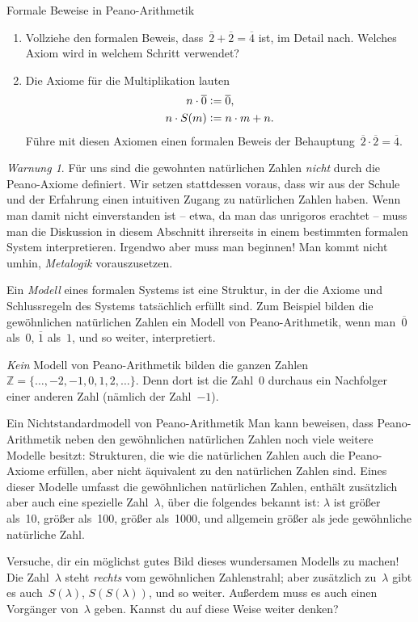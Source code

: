 \documentclass[twoside]{../zirkelblatt1415}
\newcommand{\ZZ}{\mathbb{Z}}
\theoremstyle{definition}
\theoremstyle{plain}
\theoremstyle{remark}
\newtheorem{warnung}[defn]{Warnung}
\newcommand{\defeq}{\vcentcolon=}
\newcommand{\ol}[1]{\overline{#1}}
\begin{document}
\begin{aufgabe}{Formale Beweise in Peano-Arithmetik}
\begin{enumerate}
\item Vollziehe den formalen Beweis, dass~$\ol{2} + \ol{2} = \ol{4}$ ist, im Detail nach. Welches
Axiom wird in welchem Schritt verwendet?
\item Die Axiome für die Multiplikation lauten
\begin{align*}
  n \cdot \ol{0} &\defeq \ol{0}, \\
  n \cdot S(m) &\defeq n \cdot m + n.
\end{align*}
Führe mit diesen Axiomen einen formalen Beweis der Behauptung~$\ol{2} \cdot \ol{2} = \ol{4}$.
\end{enumerate}\fixlistspacing
\end{aufgabe}

\begin{warnung}Für uns sind die gewohnten natürlichen Zahlen \emph{nicht} durch
die Peano-Axiome definiert. Wir setzen stattdessen voraus, dass wir aus der
Schule und der Erfahrung einen intuitiven Zugang zu natürlichen Zahlen haben.
Wenn man damit nicht einverstanden ist -- etwa, da man das unrigoros erachtet --
muss man die Diskussion in diesem Abschnitt ihrerseits in einem bestimmten formalen
System interpretieren. Irgendwo aber muss man beginnen! Man kommt nicht umhin,
\emph{Metalogik} vorauszusetzen.
\end{warnung}

Ein \emph{Modell} eines formalen Systems ist eine Struktur, in der die Axiome
und Schlussregeln des Systems tatsächlich erfüllt sind. Zum Beispiel bilden die
gewöhnlichen natürlichen Zahlen ein Modell von Peano-Arithmetik, wenn
man~$\ol{0}$ als~$0$, $\ol{1}$ als~$1$, und so weiter, interpretiert.

\emph{Kein} Modell von Peano-Arithmetik bilden die ganzen Zahlen~$\ZZ = \{
\ldots,-2,-1,0,1,2,\ldots \}$. Denn dort ist die Zahl~$0$ durchaus ein
Nachfolger einer anderen Zahl (nämlich der Zahl~$-1$).

\begin{aufgabe}{Ein Nichtstandardmodell von Peano-Arithmetik}
Man kann beweisen, dass Peano-Arithmetik neben den gewöhnlichen natürlichen
Zahlen noch viele weitere Modelle besitzt: Strukturen, die wie die natürlichen
Zahlen auch die Peano-Axiome erfüllen, aber nicht äquivalent zu den natürlichen
Zahlen sind. Eines dieser Modelle umfasst die gewöhnlichen natürlichen Zahlen,
enthält zusätzlich aber auch eine spezielle Zahl~$\lambda$, über die
folgendes bekannt ist: $\lambda$ ist größer als~10, größer als~100, größer
als~1000, und allgemein größer als jede gewöhnliche natürliche Zahl.

Versuche, dir ein möglichst gutes Bild dieses wundersamen Modells zu machen!
Die Zahl~$\lambda$ steht \emph{rechts} vom gewöhnlichen Zahlenstrahl; aber
zusätzlich zu~$\lambda$ gibt es auch~$S(\lambda)$, $S(S(\lambda))$, und so
weiter. Außerdem muss es auch einen Vorgänger von~$\lambda$ geben. Kannst du
auf diese Weise weiter denken?
\end{aufgabe}
\end{document}
